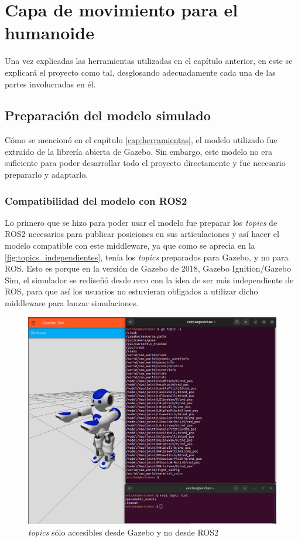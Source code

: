 \chapter{Capa de movimiento para el humanoide}\label{cap:capa_movimiento}

Una vez explicadas las herramientas utilizadas en el capítulo anterior, en este se explicará el proyecto como tal, desglosando adecuadamente cada una de las partes involucradas en él.

\section{Preparación del modelo simulado} \label{sec:prep_modelo}

Cómo se mencionó en el capítulo \ref{cap:herramientas}, el modelo utilizado fue extraído de la librería abierta de Gazebo.
Sin embargo, este modelo no era suficiente para poder desarrollar todo el proyecto directamente y fue necesario prepararlo y adaptarlo.

\subsection{Compatibilidad del modelo con ROS2}

Lo primero que se hizo para poder usar el modelo fue preparar los \textit{topics} de ROS2 necesarios para publicar posiciones en sus articulaciones y así hacer el modelo compatible con este middleware, ya que como se aprecia en la \autoref{fig:topics_independientes}, tenía los \textit{topics} preparados para Gazebo, y no para ROS. Esto es porque en la versión de Gazebo de 2018, Gazebo Ignition/Gazebo Sim, el simulador se rediseñó desde cero con la idea de ser más independiente de ROS, para que así los usuarios no estuvieran obligados a utilizar dicho middleware para lanzar simulaciones. 

\begin{figure}[H]
  \centering
  \includegraphics[width=1\textwidth]{figures/cap_4/topics_gazebo.png}
  \caption{\textit{topics} sólo accesibles desde Gazebo y no desde ROS2}
  \label{fig:topics_independientes}
\end{figure}

